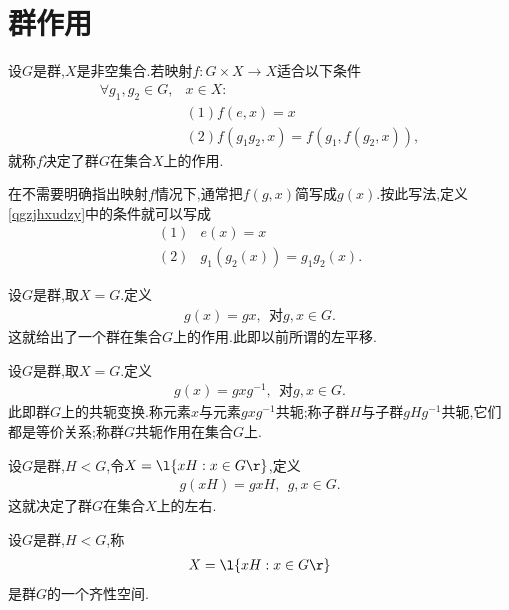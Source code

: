 \section{群作用}
\begin{definition}\label{qgzjhxudzy}
    设$G$是群,$X$是非空集合.若映射$f:G\times X\to X$适合以下条件\begin{align*}
        \forall g_1,g_2\in G,&x\in X:\\
        &(1)f(e,x)=x\\
        &(2)f(g_1g_2,x)=f(g_1,f(g_2,x)),
    \end{align*}就称$f$决定了群$G$在集合$X$上的作用.
\end{definition}
\begin{remark}
    在不需要明确指出映射$f$情况下,通常把$f(g,x)$简写成$g(x)$.按此写法,定义\ref{qgzjhxudzy}中的条件就可以写成\begin{align*}
        (1)&e(x)=x\\
        (2)&g_1(g_2(x))=g_1g_2(x).
    \end{align*}
\end{remark}
\begin{example}\label{sahuidfj}
    设$G$是群,取$X=G$.定义\begin{align*}
        g(x)=gx,\ \ \text{对}g,x\in G.
    \end{align*}这就给出了一个群在集合$G$上的作用.此即以前所谓的左平移.
\end{example}
\begin{example}[共轭变换]\label{gebh}
    设$G$是群,取$X=G$.定义\begin{align*}
        g(x)=gxg^{-1},\ \ \text{对}g,x\in G.
    \end{align*}此即群$G$上的共轭变换.称元素$x$与元素$gxg^{-1}$共轭;称子群$H$与子群$gHg^{-1}$共轭,它们都是等价关系;称群$G$共轭作用在集合$G$上.
\end{example}
\begin{example}\label{sdghbj}
    设$G$是群,$H<G$,令$X=\l\{xH:x\in G\r\}$,定义\begin{align*}
        g(xH)=gxH,\ \ g,x\in G.
    \end{align*}这就决定了群$G$在集合$X$上的左右.
\end{example}
\begin{definition}[齐性空间]
    设$G$是群,$H<G$,称\begin{align*}
        X=\l\{xH:x\in G\r\}
    \end{align*}是群$G$的一个齐性空间.
\end{definition}
